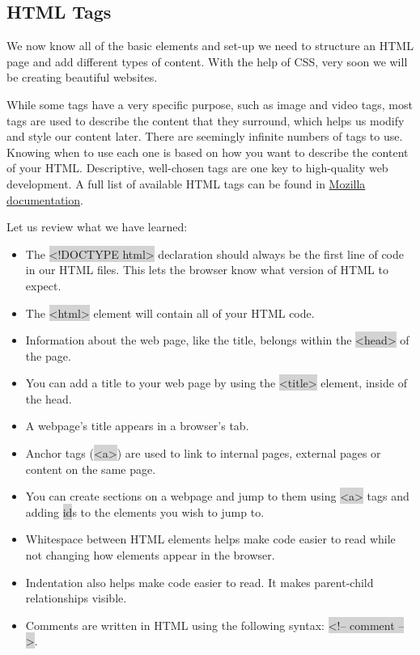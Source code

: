 \documentclass[11pt]{article}
\begin{document}
\subsection{HTML Tags}
We now know all of the basic elements and set-up we need to structure an HTML page and add different types of content. With the help of CSS, very soon we will be creating beautiful websites. 

While some tags have a very specific purpose, such as image and video tags, most tags are used to describe the content that they surround, which helps us modify and style our content later. There are seemingly infinite numbers of tags to use. Knowing when to use each one is based on how you want to describe the content of your HTML. Descriptive, well-chosen tags are one key to high-quality web development. A full list of available HTML tags can be found in \href{https://developer.mozilla.org/en-US/docs/Web/HTML/Element}{Mozilla documentation}.

Let us review what we have learned:
\begin{itemize}[leftmargin = *]
\item The \colorbox{lightgray}{<!DOCTYPE html>} declaration should always be the first line of code in our HTML files. This lets the browser know what version of HTML to expect.
\item The \colorbox{lightgray}{<html>} element will contain all of your HTML code.
\item Information about the web page, like the title, belongs within the \colorbox{lightgray}{<head>} of the page.
\item You can add a title to your web page by using the \colorbox{lightgray}{<title>} element, inside of the head.
\item A webpage’s title appears in a browser’s tab.
\item Anchor tags (\colorbox{lightgray}{<a>}) are used to link to internal pages, external pages or content on the same page.
\item You can create sections on a webpage and jump to them using \colorbox{lightgray}{<a>} tags and adding \colorbox{lightgray}{id}s to the elements you wish to jump to.
\item Whitespace between HTML elements helps make code easier to read while not changing how elements appear in the browser.
\item Indentation also helps make code easier to read. It makes parent-child relationships visible.
\item Comments are written in HTML using the following syntax: \colorbox{lightgray}{<!-- comment -->}.
\end{itemize}
\end{document}
